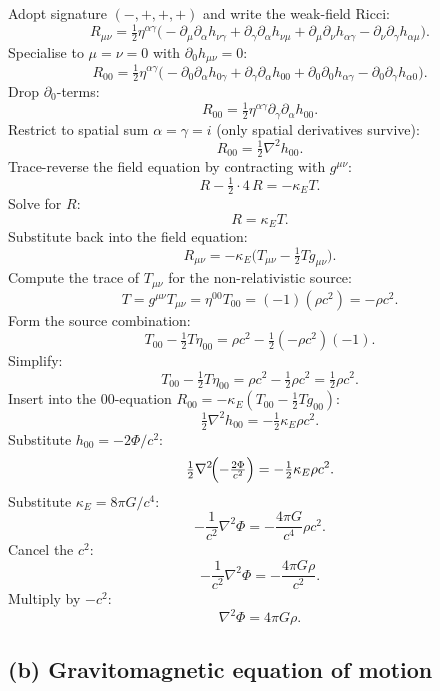 \documentclass[11pt]{article}
\newcommand{\Lap}{\nabla^{2}}
\begin{document}
Adopt signature $(-,+,+,+)$ and write the weak-field Ricci:
\[
R_{\mu\nu}=\tfrac{1}{2}\eta^{\alpha\gamma}\bigl(-\partial_{\mu}\partial_{\alpha}h_{\nu\gamma}+\partial_{\gamma}\partial_{\alpha}h_{\nu\mu}+\partial_{\mu}\partial_{\nu}h_{\alpha\gamma}-\partial_{\nu}\partial_{\gamma}h_{\alpha\mu}\bigr).
\]
Specialise to $\mu=\nu=0$ with $\partial_{0}h_{\mu\nu}=0$:
\[
R_{00}=\tfrac{1}{2}\eta^{\alpha\gamma}\bigl(-\partial_{0}\partial_{\alpha}h_{0\gamma}+\partial_{\gamma}\partial_{\alpha}h_{00}+\partial_{0}\partial_{0}h_{\alpha\gamma}-\partial_{0}\partial_{\gamma}h_{\alpha 0}\bigr).
\]
Drop $\partial_{0}$-terms:
\[
R_{00}=\tfrac{1}{2}\eta^{\alpha\gamma}\partial_{\gamma}\partial_{\alpha}h_{00}.
\]
Restrict to spatial sum $\alpha=\gamma=i$ (only spatial derivatives survive):
\[
R_{00}=\tfrac{1}{2}\Lap h_{00}.
\]
Trace-reverse the field equation by contracting with $g^{\mu\nu}$:
\[
R-\tfrac{1}{2}\cdot 4\,R=-\kappa_{E}T.
\]
Solve for $R$:
\[
R=\kappa_{E}T.
\]
Substitute back into the field equation:
\[
R_{\mu\nu}=-\kappa_{E}\bigl(T_{\mu\nu}-\tfrac{1}{2}T g_{\mu\nu}\bigr).
\]
Compute the trace of $T_{\mu\nu}$ for the non-relativistic source:
\[
T=g^{\mu\nu}T_{\mu\nu}=\eta^{00}T_{00}=(-1)(\rho c^{2})=-\rho c^{2}.
\]
Form the source combination:
\[
T_{00}-\tfrac{1}{2}T\eta_{00}=\rho c^{2}-\tfrac{1}{2}(-\rho c^{2})(-1).
\]
Simplify:
\[
T_{00}-\tfrac{1}{2}T\eta_{00}=\rho c^{2}-\tfrac{1}{2}\rho c^{2}=\tfrac{1}{2}\rho c^{2}.
\]
Insert into the $00$-equation $R_{00}=-\kappa_{E}(T_{00}-\tfrac{1}{2}T g_{00})$:
\[
\tfrac{1}{2}\Lap h_{00}=-\tfrac{1}{2}\kappa_{E}\rho c^{2}.
\]
Substitute $h_{00}=-2\Phi/c^{2}$:
\[
\tfrac{1}{2}\Lap\!\Bigl(-\tfrac{2\Phi}{c^{2}}\Bigr)=-\tfrac{1}{2}\kappa_{E}\rho c^{2}.
\]
Substitute $\kappa_{E}=8\pi G/c^{4}$:
\[
-\frac{1}{c^{2}}\Lap\Phi=-\frac{4\pi G}{c^{4}}\rho c^{2}.
\]
Cancel the $c^{2}$:
\[
-\frac{1}{c^{2}}\Lap\Phi=-\frac{4\pi G\rho}{c^{2}}.
\]
Multiply by $-c^{2}$:
\begin{equation}
\boxed{\;\Lap\Phi=4\pi G\rho.\;}
\label{eq:NewtonPoisson}
\end{equation}

\subsection*{(b) Gravitomagnetic equation of motion}
\end{document}
